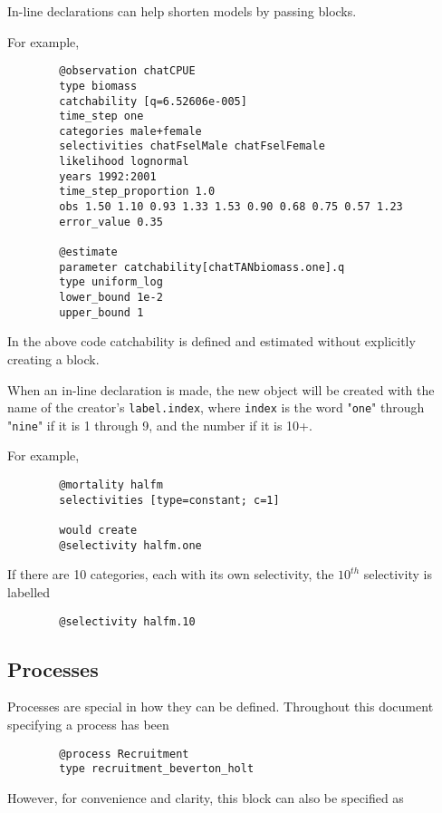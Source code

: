 In-line declarations can help shorten models by passing \command{} blocks.

For example,

{\small{\begin{verbatim}
		@observation chatCPUE
		type biomass
		catchability [q=6.52606e-005]
		time_step one
		categories male+female
		selectivities chatFselMale chatFselFemale
		likelihood lognormal
		years 1992:2001
		time_step_proportion 1.0
		obs 1.50 1.10 0.93 1.33 1.53 0.90 0.68 0.75 0.57 1.23
		error_value 0.35

		@estimate
		parameter catchability[chatTANbiomass.one].q
		type uniform_log
		lower_bound 1e-2
		upper_bound 1
		\end{verbatim}}}

In the above code catchability is defined and estimated without explicitly creating a  block.

When an in-line declaration is made, the new object will be created with the name of the creator's \texttt{label.index}, where \texttt{index} is the word "\texttt{one}" through "\texttt{nine}" if it is 1 through 9, and the number if it is 10+.

For example,

{\small{\begin{verbatim}
		@mortality halfm
		selectivities [type=constant; c=1]

		would create
		@selectivity halfm.one
		\end{verbatim}}}

If there are 10 categories, each with its own selectivity, the $10^{th}$ selectivity is labelled

{\small{\begin{verbatim}
		@selectivity halfm.10
		\end{verbatim}}}

\subsection{Processes}

Processes are special in how they can be defined. Throughout this document specifying a process has been

{\small{\begin{verbatim}
		@process Recruitment
		type recruitment_beverton_holt
		\end{verbatim}}}
	
However, for convenience and clarity, this block can also be specified as

